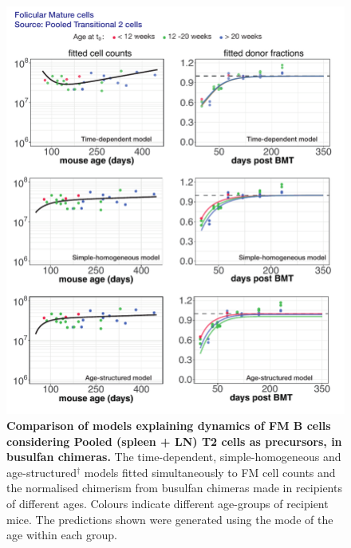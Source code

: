 \documentclass[11pt]{article}
\begin{document}
\begin{figure}[h!]
	\centerline{\includegraphics[scale = 1.1] {FM_T2.pdf}}
	\caption{\small \textbf{Comparison of models  explaining dynamics of FM B cells considering Pooled (spleen + LN) T2 cells as precursors, in busulfan chimeras.} The time-dependent, simple-homogeneous and age-structured$^{\dagger}$ models fitted simultaneously to FM cell counts and the normalised chimerism from busulfan chimeras made in recipients of different ages. Colours indicate different age-groups of recipient mice. The predictions shown were generated using the  mode of the age within each group.}
	
	\label{fig:FM_T2}
\end{figure}

\end{document}
